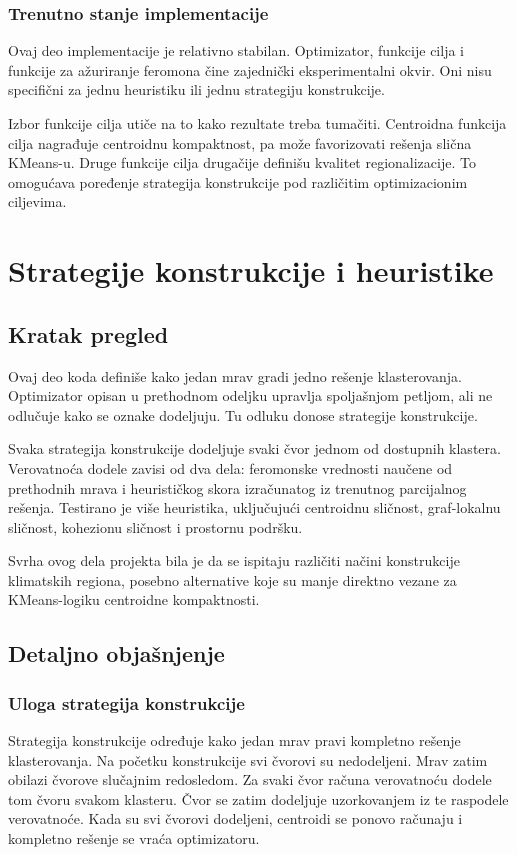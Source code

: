 \documentclass[11pt]{article}
\begin{document}
\subsubsection{Trenutno stanje implementacije}
Ovaj deo implementacije je relativno stabilan. Optimizator, funkcije cilja i funkcije za ažuriranje feromona čine zajednički eksperimentalni okvir. Oni nisu specifični za jednu heuristiku ili jednu strategiju konstrukcije.

Izbor funkcije cilja utiče na to kako rezultate treba tumačiti. Centroidna funkcija cilja nagrađuje centroidnu kompaktnost, pa može favorizovati rešenja slična KMeans-u. Druge funkcije cilja drugačije definišu kvalitet regionalizacije. To omogućava poređenje strategija konstrukcije pod različitim optimizacionim ciljevima.

\section{Strategije konstrukcije i heuristike}
\label{sec:strategies}

\subsection{Kratak pregled}
Ovaj deo koda definiše kako jedan mrav gradi jedno rešenje klasterovanja. Optimizator opisan u prethodnom odeljku upravlja spoljašnjom petljom, ali ne odlučuje kako se oznake dodeljuju. Tu odluku donose strategije konstrukcije.

Svaka strategija konstrukcije dodeljuje svaki čvor jednom od dostupnih klastera. Verovatnoća dodele zavisi od dva dela: feromonske vrednosti naučene od prethodnih mrava i heurističkog skora izračunatog iz trenutnog parcijalnog rešenja. Testirano je više heuristika, uključujući centroidnu sličnost, graf-lokalnu sličnost, kohezionu sličnost i prostornu podršku.

Svrha ovog dela projekta bila je da se ispitaju različiti načini konstrukcije klimatskih regiona, posebno alternative koje su manje direktno vezane za KMeans-logiku centroidne kompaktnosti.

\subsection{Detaljno objašnjenje}

\subsubsection{Uloga strategija konstrukcije}
Strategija konstrukcije određuje kako jedan mrav pravi kompletno rešenje klasterovanja. Na početku konstrukcije svi čvorovi su nedodeljeni. Mrav zatim obilazi čvorove slučajnim redosledom. Za svaki čvor računa verovatnoću dodele tom čvoru svakom klasteru. Čvor se zatim dodeljuje uzorkovanjem iz te raspodele verovatnoće. Kada su svi čvorovi dodeljeni, centroidi se ponovo računaju i kompletno rešenje se vraća optimizatoru.
\end{document}
